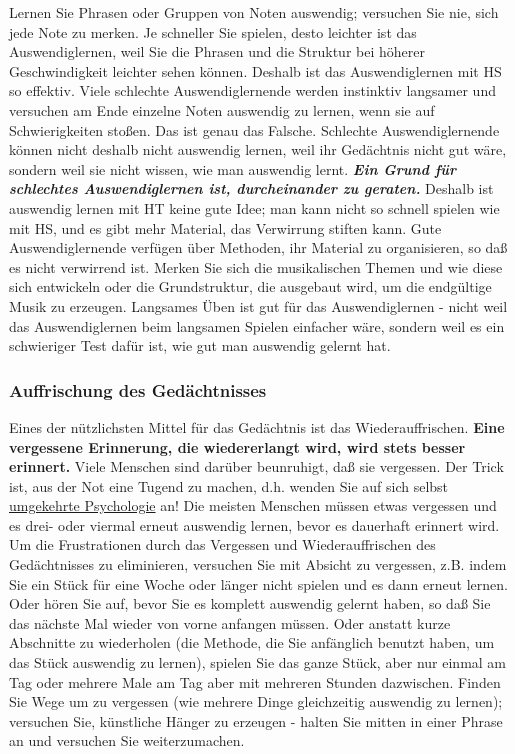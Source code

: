 Lernen Sie Phrasen oder Gruppen von Noten auswendig; versuchen Sie nie, sich jede Note zu merken.
Je schneller Sie spielen, desto leichter ist das Auswendiglernen, weil Sie die Phrasen und die Struktur bei höherer Geschwindigkeit leichter sehen können.
Deshalb ist das Auswendiglernen mit HS so effektiv.
Viele schlechte Auswendiglernende werden instinktiv langsamer und versuchen am Ende einzelne Noten auswendig zu lernen, wenn sie auf Schwierigkeiten stoßen.
Das ist genau das Falsche.
Schlechte Auswendiglernende können nicht deshalb nicht auswendig lernen, weil ihr Gedächtnis nicht gut wäre, sondern weil sie nicht wissen, wie man auswendig lernt.
\textbf{\textit{Ein Grund für schlechtes Auswendiglernen ist, durcheinander zu geraten.}}
Deshalb ist auswendig lernen mit HT keine gute Idee; man kann nicht so schnell spielen wie mit HS, und es gibt mehr Material, das Verwirrung stiften kann.
Gute Auswendiglernende verfügen über Methoden, ihr Material zu organisieren, so daß es nicht verwirrend ist.
Merken Sie sich die musikalischen Themen und wie diese sich entwickeln oder die Grundstruktur, die ausgebaut wird, um die endgültige Musik zu erzeugen.
Langsames Üben ist gut für das Auswendiglernen - nicht weil das Auswendiglernen beim langsamen Spielen einfacher wäre, sondern weil es ein schwieriger Test dafür ist, wie gut man auswendig gelernt hat.


\subsubsection{Auffrischung des Gedächtnisses}
\label{c1iii6f}

Eines der nützlichsten Mittel für das Gedächtnis ist das Wiederauffrischen.
\textbf{Eine vergessene Erinnerung, die wiedererlangt wird, wird stets besser erinnert.}
Viele Menschen sind darüber beunruhigt, daß sie vergessen.
Der Trick ist, aus der Not eine Tugend zu machen, d.h. wenden Sie auf sich selbst \hyperref[reversepsychology]{umgekehrte Psychologie} an!
Die meisten Menschen müssen etwas vergessen und es drei- oder viermal erneut auswendig lernen, bevor es dauerhaft erinnert wird.
Um die Frustrationen durch das Vergessen und Wiederauffrischen des Gedächtnisses zu eliminieren, versuchen Sie mit Absicht zu vergessen, z.B. indem Sie ein Stück für eine Woche oder länger nicht spielen und es dann erneut lernen.
Oder hören Sie auf, bevor Sie es komplett auswendig gelernt haben, so daß Sie das nächste Mal wieder von vorne anfangen müssen.
Oder anstatt kurze Abschnitte zu wiederholen (die Methode, die Sie anfänglich benutzt haben, um das Stück auswendig zu lernen), spielen Sie das ganze Stück, aber nur einmal am Tag oder mehrere Male am Tag aber mit mehreren Stunden dazwischen.
Finden Sie Wege um zu vergessen (wie mehrere Dinge gleichzeitig auswendig zu lernen); versuchen Sie, künstliche Hänger zu erzeugen - halten Sie mitten in einer Phrase an und versuchen Sie weiterzumachen.

